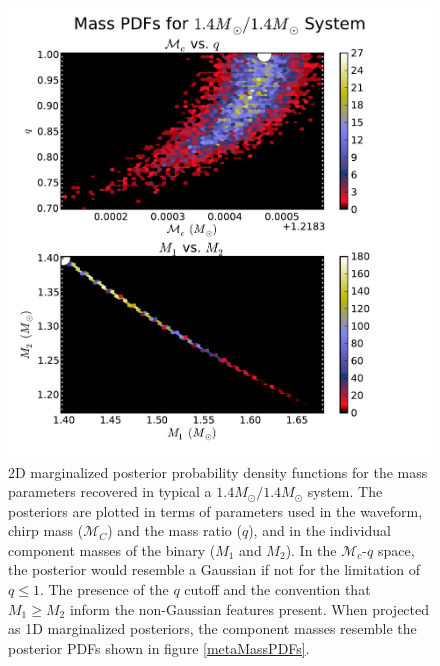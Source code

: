 \documentclass[11pt,a4paper]{emulateapj}
\begin{document}
\begin{figure}[h!]
  \centering
 \includegraphics[trim=0cm 0cm 2cm 0cm, clip=false,scale=0.56]{1414masses2D.pdf}
 \caption{2D marginalized posterior probability density functions for the mass parameters recovered in typical a $1.4M_{\odot}/1.4M_{\odot}$ system.  The posteriors are plotted in terms of parameters used in the waveform, chirp mass ($\mathcal{M}_C$) and the mass ratio ($q$), and in the individual component masses of the binary ($M_1$ and $M_2$).  In the $\mathcal{M}_c$-$q$ space, the posterior would resemble a Gaussian if not for the limitation of $q \leq 1$.  The presence of the $q$ cutoff and the convention that $M_1 \geq M_2$ inform the non-Gaussian features present.  When projected as 1D marginalized posteriors, the component masses resemble the posterior PDFs shown in figure \ref{metaMassPDFs}.}
  \label{1414masses}
\end{figure}
\end{document}
